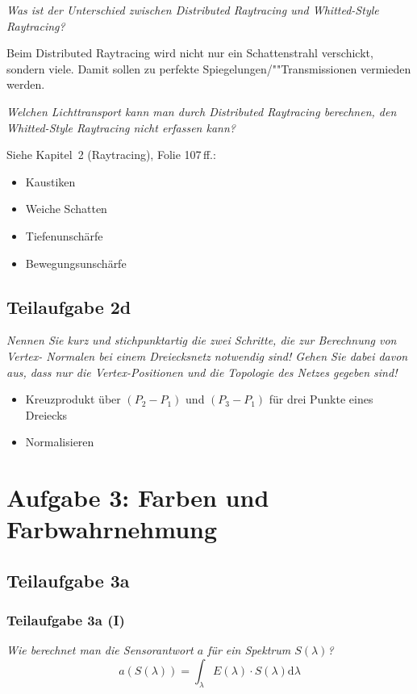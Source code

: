 \documentclass[a4paper]{scrartcl}
\begin{document}
\textit{Was ist der Unterschied zwischen Distributed Raytracing und Whitted-Style Raytracing?}

Beim Distributed Raytracing wird nicht nur ein Schattenstrahl verschickt, sondern
viele. Damit sollen zu perfekte Spiegelungen/""Transmissionen vermieden werden.

\textit{Welchen Lichttransport kann man durch Distributed Raytracing berechnen, den
Whitted-Style Raytracing nicht erfassen kann?}

Siehe Kapitel~2 (Raytracing), Folie 107\,ff.:

\begin{itemize}
    \item Kaustiken
    \item Weiche Schatten
    \item Tiefenunschärfe
    \item Bewegungsunschärfe
\end{itemize}

\subsection*{Teilaufgabe 2d}
\textit{Nennen Sie kurz und stichpunktartig die zwei Schritte, die zur Berechnung von Vertex-
Normalen bei einem Dreiecksnetz notwendig sind! Gehen Sie dabei davon aus, dass nur
die Vertex-Positionen und die Topologie des Netzes gegeben sind!}

\begin{itemize}
	\item Kreuzprodukt über $(P_2-P_1)$ und $(P_3 - P_1)$ für drei Punkte eines Dreiecks
	\item Normalisieren
\end{itemize}

\clearpage
\section*{Aufgabe 3: Farben und Farbwahrnehmung}
\subsection*{Teilaufgabe 3a}
\subsubsection*{Teilaufgabe 3a (I)}
\textit{Wie berechnet man die Sensorantwort $a$ für ein Spektrum $S(\lambda)$?}
\[a(S(\lambda)) = \int_\lambda E(\lambda) \cdot S(\lambda) \mathrm{d} \lambda \]
\end{document}
